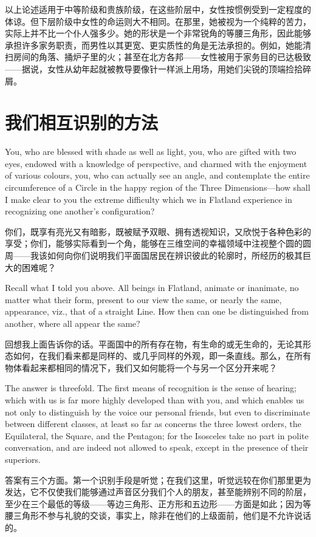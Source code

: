 \documentclass[12pt,UTF8]{ctexbook}
\begin{document}
以上论述适用于中等阶级和贵族阶级，在这些阶层中，女性按惯例受到一定程度的体谅。但下层阶级中女性的命运则大不相同。在那里，她被视为一个纯粹的苦力，实际上并不比一个仆人强多少。她的形状是一个非常锐角的等腰三角形，因此能够承担许多家务职责，而男性以其更宽、更实质性的角是无法承担的。例如，她能清扫房间的角落、捅炉子里的火；甚至在北方各邦——女性被用于家务目的已达极致——据说，女性从幼年起就被教导要像针一样派上用场，用她们尖锐的顶端捡拾碎屑。

\chapter{我们相互识别的方法}

You, who are blessed with shade as well as light, you, who are gifted with two eyes, endowed with a knowledge of perspective, and charmed with the enjoyment of various colours, you, who can actually see an angle, and contemplate the entire circumference of a Circle in the happy region of the Three Dimensions---how shall I make clear to you the extreme difficulty which we in Flatland experience in recognizing one another's configuration?

你们，既享有亮光又有暗影，既被赋予双眼、拥有透视知识，又欣悦于各种色彩的享受；你们，能够实际看到一个角，能够在三维空间的幸福领域中注视整个圆的圆周——我该如何向你们说明我们平面国居民在辨识彼此的轮廓时，所经历的极其巨大的困难呢？

Recall what I told you above. All beings in Flatland, animate or inanimate, no matter what their form, present to our view the same, or nearly the same, appearance, viz., that of a straight Line. How then can one be distinguished from another, where all appear the same?

回想我上面告诉你的话。平面国中的所有存在物，有生命的或无生命的，无论其形态如何，在我们看来都是同样的、或几乎同样的外观，即一条直线。那么，在所有物体看起来都相同的情况下，我们又如何能将一个与另一个区分开来呢？

The answer is threefold. The first means of recognition is the sense of hearing; which with us is far more highly developed than with you, and which enables us not only to distinguish by the voice our personal friends, but even to discriminate between different classes, at least so far as concerns the three lowest orders, the Equilateral, the Square, and the Pentagon; for the Isosceles take no part in polite conversation, and are indeed not allowed to speak, except in the presence of their superiors.

答案有三个方面。第一个识别手段是听觉；在我们这里，听觉远较在你们那里更为发达，它不仅使我们能够通过声音区分我们个人的朋友，甚至能辨别不同的阶层，至少在三个最低的等级——等边三角形、正方形和五边形——方面是如此；因为等腰三角形不参与礼貌的交谈，事实上，除非在他们的上级面前，他们是不允许说话的。
\end{document}
